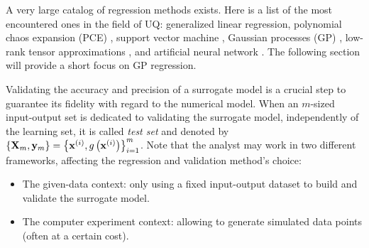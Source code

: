 A very large catalog of regression methods exists. 
Here is a list of the most encountered ones in the field of UQ:
generalized linear regression, polynomial chaos expansion (PCE) \citep{soize_2004, blatman_2011}, support vector machine \citep{vapnik_1995}, 
Gaussian processes (GP) \citep{rasmussen_2006}, low-rank tensor approximations \citep{grasedyck_2013}, and artificial neural network \citep{tibshirani_2009}.
The following section will provide a short focus on GP regression. %

Validating the accuracy and precision of a surrogate model is a crucial step to guarantee its fidelity with regard to the numerical model. 
When an $m$-sized input-output set is dedicated to validating the surrogate model, independently of the learning set, 
it is called \textit{test set} and denoted by $\left\{{\bf X}_m, {\bf y}_m\right\} = \left\{{\bf x}^{(i)}, g\left({\bf x}^{(i)}\right)\right\}_{i=1}^m$. 
Note that the analyst may work in two different frameworks, affecting the regression and validation method's choice: 
\begin{itemize}
    \item The given-data context: only using a fixed input-output dataset to build and validate the surrogate model. 
    \item The computer experiment context: allowing to generate simulated data points (often at a certain cost).
\end{itemize}

